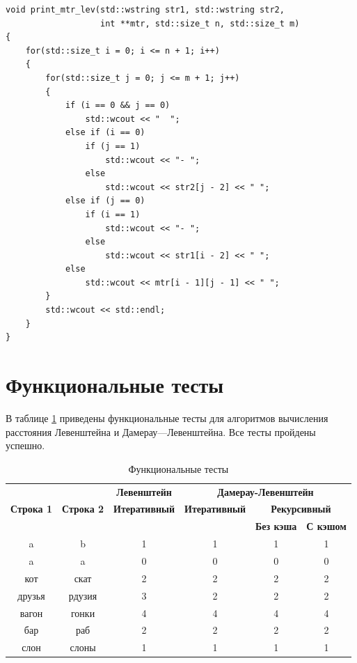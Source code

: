 \documentclass[a4paper,14pt, unknownkeysallowed]{bmstu}
\begin{document}
\begin{lstlisting}[label=lst:print_mtr,caption=Функции вывода матрицы для алгоритмов поиска расстояния Левенштейна и Дамерау-Левенштейна]
void print_mtr_lev(std::wstring str1, std::wstring str2,
                   int **mtr, std::size_t n, std::size_t m)
{
    for(std::size_t i = 0; i <= n + 1; i++)
    {
        for(std::size_t j = 0; j <= m + 1; j++)
        {
            if (i == 0 && j == 0)
                std::wcout << "  ";
            else if (i == 0)
                if (j == 1)
                    std::wcout << "- ";
                else
                    std::wcout << str2[j - 2] << " ";
            else if (j == 0)
                if (i == 1)
                    std::wcout << "- ";
                else
                    std::wcout << str1[i - 2] << " ";
            else
                std::wcout << mtr[i - 1][j - 1] << " ";
        }
        std::wcout << std::endl;
    }
}
\end{lstlisting}

\clearpage

\section{Функциональные тесты}

В таблице \ref{tbl:func_tests} приведены функциональные тесты для алгоритмов вычисления расстояния Левенштейна и Дамерау—Левенштейна. Все тесты пройдены успешно.

\begin{table}[ht]
	\small
	\begin{center}
		\caption{Функциональные тесты}
		\label{tbl:func_tests}
		\begin{tabular}{|c|c|c|c|c|c|}
			\hline
			&
			& \multicolumn{1}{c|}{\bfseries Левенштейн}
			& \multicolumn{3}{c|}{\bfseries Дамерау-Левенштейн} \\ \cline{3-6}

			\bfseries Строка 1 & \bfseries Строка 2 & \bfseries Итеративный & \bfseries Итеративный

			& \multicolumn{2}{c|}{\bfseries Рекурсивный} \\ \cline{5-6}
			& & & & \bfseries Без кэша & \bfseries С кэшом \\
			\hline
			a & b & 1 & 1 & 1 & 1 \\
			\hline
			a & a & 0 & 0 & 0 & 0 \\
			\hline
			кот & скат & 2 & 2 & 2 & 2 \\
			\hline
			друзья & рдузия & 3 & 2 & 2 & 2 \\
			\hline
			вагон & гонки & 4 & 4 & 4 & 4 \\
			\hline
			бар & раб & 2 & 2 & 2 & 2 \\
			\hline
			слон & слоны & 1 & 1 & 1 & 1 \\
			\hline
		\end{tabular}
	\end{center}
\end{table}
\end{document}

